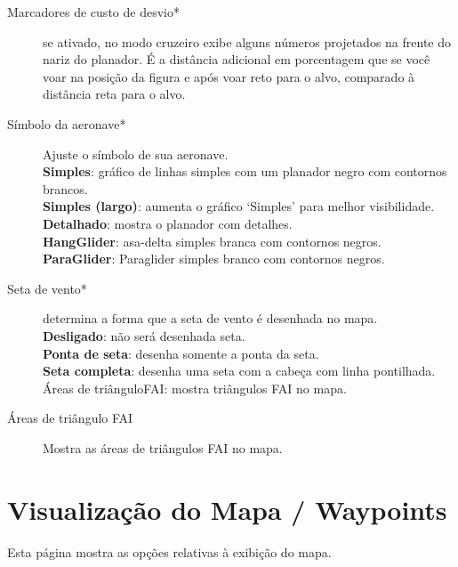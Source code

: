 \begin{description}
\item[Marcadores de custo de desvio*]  se ativado, no modo cruzeiro exibe alguns números projetados na frente do nariz do planador.  É a distância adicional em porcentagem que se você voar na posição da figura e após voar reto para o alvo, comparado à distância reta para o alvo.
\item[Símbolo da aeronave*]  Ajuste o símbolo de sua aeronave. \\
  {\bf Simples}: gráfico de linhas simples com um planador negro com contornos brancos. \\
  {\bf Simples (largo)}: aumenta o gráfico ‘Simples’ para melhor visibilidade. \\
  {\bf Detalhado}: mostra o planador com detalhes. \\
  {\bf HangGlider}: asa-delta simples branca com contornos negros. \\
  {\bf ParaGlider}: Paraglider simples branco com contornos negros.
\item[Seta de vento*]  determina a forma que a seta de vento é desenhada no mapa. \\
  {\bf Desligado}: não será desenhada seta. \\
  {\bf Ponta de seta}: desenha somente a ponta da seta. \\
  {\bf Seta completa}: desenha uma seta com a cabeça com linha pontilhada.  Áreas de triânguloFAI: mostra triângulos FAI no mapa.
\item[Áreas de triângulo FAI] Mostra as áreas de triângulos FAI no mapa.
  
\end{description}


\section{Visualização do Mapa / Waypoints}\label{sec:waypoint-display}

Esta página mostra as opções relativas à exibição do mapa.

